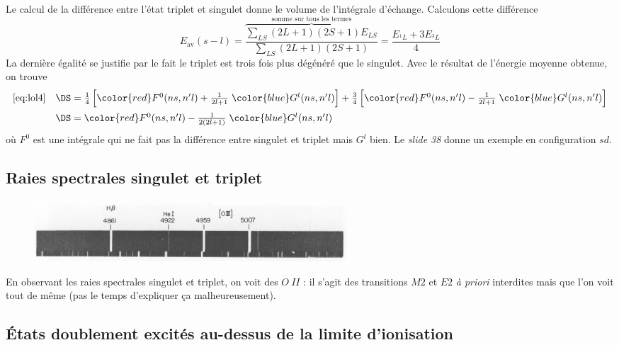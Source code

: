 Le calcul de la différence entre l'état triplet et singulet donne le volume de l'intégrale d'échange.
Calculons cette différence
\begin{equation}
E_{\mbox{av}}(s-l) 
= \overbrace{\frac{\sum_{LS} (2L+1)(2S+1) E_{LS}}
{\sum_{LS} (2L+1)(2S+1)}}^{\text{somme sur tous les termes}}
=
\frac{ E_{^1L} + 3  E_{^3L} }{4}
\label{eq:lol4}
\end{equation}
La dernière égalité se justifie par le fait le triplet est trois fois plus dégénéré que le singulet.
Avec le résultat de l'énergie moyenne obtenue, on trouve
\begin{equation}
\begin{array}{ll}
\eqref{eq:lol4} &\DS = \frac{1}{4} \left[ 
{\color{red} F^0(ns,n'l)} + \frac{1}{2l+1} \; 
{\color{blue} G^l(ns,n'l)}  \right]
+ 
\frac{3}{4}  \left[
{\color{red} F^0(ns,n'l)} - \frac{1}{2l+1} \; 
{\color{blue} G^l(ns,n'l)}  \right]\vspace{2mm}\\
&\DS = 
{\color{red} F^0(ns,n'l)} - \frac{1}{2(2l+1)} \; 
{\color{blue} G^l(ns,n'l)}
\end{array}
\end{equation}
où $F^0$ est une intégrale qui ne fait pas la différence entre singulet et triplet mais $G^l$ bien.
Le \textit{slide 38} donne un exemple en configuration $sd$.


\subsection{Raies spectrales singulet et triplet}
	\begin{figure}
	\vspace{-7mm}
	\includegraphics[scale=0.6]{ch3/image7}
	\end{figure}

En observant les raies spectrales singulet et triplet, on voit des $O\ II$ : il s'agit des transitions
$M2$ et $E2$ \textit{à priori} interdites mais que l'on voit tout de même (pas le temps d'expliquer
ça malheureusement).

\newpage
\subsection{États doublement excités au-dessus de la limite d'ionisation}

